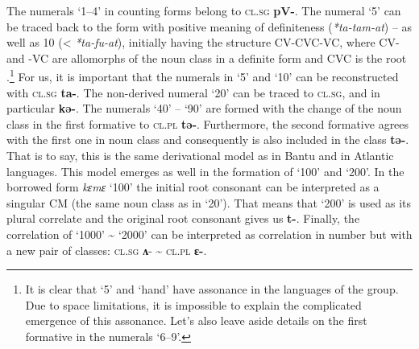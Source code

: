 \begin{table}
\caption{\label{tab:1:15} Noun classes in Temne numerals}
\end{table}

The numerals ‘1--4’ in counting forms belong to \textsc{cl}.\textsc{sg} \textbf{pV-}. The numeral ‘5’ can be traced back to the form with positive meaning of definiteness (\textit{*ta-tam-at}) – as well as 10 (< \textit{*ta-fu-at}), initially having the structure CV-CVC-VC, where CV-  and  -VC  are allomorphs of the noun class in a definite form and CVC is the root \citep[143--144]{Pozdniakov1993}.\footnote{It is clear that `5' and `hand' have assonance in the languages of the group. Due to space limitations, it is impossible to explain the complicated emergence of this assonance. Let's also leave aside details on the first formative in the numerals ‘6--9’.} For us, it is important that the numerals in ‘5’ and ‘10’ can be reconstructed with \textsc{cl}.\textsc{sg} \textbf{ta-}. The non-derived numeral `20' can be traced to \textsc{cl}.\textsc{sg}, and  in particular \textbf{kə-}. The numerals ‘40’ – ‘90’ are formed with the change of the noun class in the first formative to \textsc{cl}.\textsc{pl} \textbf{tə-}. Furthermore, the second formative agrees with the first one in noun class and consequently is also included in the class \textbf{tə-}. That is to say, this is the same derivational model as in Bantu and in Atlantic languages. This model emerges as well in the formation of ‘100’ and ‘200’. In the borrowed form \textit{kɛmɛ} ‘100’ the initial root consonant can be interpreted as a singular CM (the same noun class as in ‘20’). That means that ‘200’ is used as its plural correlate and the original root consonant gives us \textbf{t-}. Finally, the correlation of ‘1000’ {\textasciitilde} ‘2000’ can be interpreted as correlation in number but with a new pair of classes: \textsc{cl}.\textsc{sg} \textbf{ʌ}- {\textasciitilde} \textsc{cl}.\textsc{pl} \textbf{ɛ-}.

